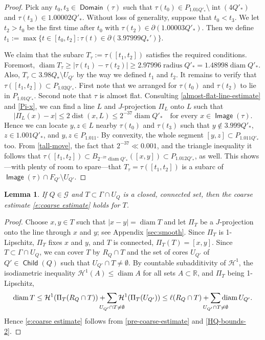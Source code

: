 \documentclass[12pt]{amsart}
\numberwithin{equation}{section}
\theoremstyle{plain}
\newtheorem{lemma}[theorem]{Lemma}
\theoremstyle{definition}
\def\RR{\mathbb{R}}
\newcommand{\radius}{\mathop\mathrm{radius}\nolimits}
\newcommand{\diam}{\mathop\mathrm{diam}\nolimits}
\newcommand{\dist}{\mathop\mathrm{dist}\nolimits}
\newcommand{\Haus}{\mathcal{H}}
\newcommand{\Domain}{\mathop\mathsf{Domain}\nolimits}
\newcommand{\Image}{\mathop\mathsf{Image}\nolimits}
\newcommand{\Child}{\mathop\mathsf{Child}\nolimits}
\newcommand{\interior}{\mathop\mathrm{int}\nolimits}
\numberwithin{figure}{section}
\begin{document}
\begin{proof}Pick any $t_0,t_3\in\Domain(\tau)$ such that $\tau(t_0)\in P_{1.01Q'_*}\setminus \interior(4Q'_*)$ and  $\tau(t_3)\in 1.00002Q'_*$. Without loss of generality, suppose that $t_0<t_3$. We let $t_2 > t_0$ be the first time after $t_0$ with $\tau(t_2) \in \partial(1.00003Q'_*)$. Then we define $t_1 := \max\{t \in [t_0, t_2] : \tau(t) \in \partial(3.97999Q_*') \}.$

We claim that the subarc $T_{\tau}:=\tau([t_1,t_2])$ satisfies the required conditions. Foremost, $\diam T_\tau\geq |\tau(t_1)-\tau(t_2)|\geq 2.97996 \radius Q'_*=1.48998\diam Q'_*$. Also, $T_{\tau}\subset 3.98Q_*\setminus U_{Q'}$ by the way we defined $t_1$ and $t_2$. It remains to verify that $\tau([t_1,t_2]) \subset P_{1.02Q'_*}$. First note that we arranged for $\tau(t_0)$ and $\tau(t_2)$ to lie in $P_{1.01 Q'_*}$. Second note that $\tau$ is almost flat. Consulting \eqref{almost-flat-line-estimate} and \eqref{Pi-x}, we can find a line $L$ and $J$-projection $\Pi_L$ onto $L$ such that \begin{equation}\label{tall-move} |\Pi_L(x)-x|\leq 2\dist(x,L)\leq 2^{-37}\diam Q'_*\quad\text{for every $x\in \Image(\tau)$}.\end{equation} Hence we can locate $y,z\in L$ nearby $\tau(t_0)$ and $\tau(t_3)$ such that $y\not\in 3.999Q'_*$, $z\in 1.001Q'_*$, and $y,z\in P_{1.011}$. By convexity, the whole segment $[y,z]\subset P_{1.011Q'_*}$ too. From \eqref{tall-move}, the fact that $2^{-37}\ll 0.001$, and the triangle inequality it follows that $\tau([t_1, t_2]) \subset B_{2^{-37}\diam Q'_*}([x, y]) \subset P_{1.012Q'_*}$, as well. This shows---with plenty of room to spare---that $T_\tau=\tau([t_1,t_2])$ is a subarc of $\Image(\tau)\cap F_{Q'}\setminus U_{Q'}$.
\end{proof}

\begin{lemma}\label{proof-of-coarse} If $Q\in\mathscr{G}$ and $T\subset \Gamma\cap U_Q$ is a closed, connected set, then the coarse estimate \eqref{e:coarse estimate} holds for $T$.\end{lemma}

\begin{proof} Choose $x,y\in T$ such that $|x-y|=\diam T$ and let $\Pi_T$ be a $J$-projection onto the line through $x$ and $y$; see Appendix \ref{sec:smooth}. Since $\Pi_T$ is 1-Lipschitz, $\Pi_T$ fixes $x$ and $y$, and $T$ is connected, $\Pi_T(T)=[x,y]$. Since $T\subset \Gamma\cap U_Q$, we can cover $T$ by $R_Q\cap T$ and the set of cores $U_{Q'}$ of $Q'\in\Child(Q)$ such that $U_{Q'}\cap T\neq\emptyset$. By countable subadditivity of $\Haus^1$, the isodiametric inequality $\Haus^1(A)\leq \diam A$ for all sets $A\subset\RR$, and $\Pi_T$ being 1-Lipschitz,  \begin{equation}\label{pre-coarse-estimate} \diam T \leq \Haus^1(\Pi_T(R_Q\cap T))+\sum_{\mathclap{U_{Q'}\cap T\neq\emptyset}}\Haus^1(\Pi_T(U_{Q'})) \leq \ell(R_Q\cap T)+\sum_{\mathclap{U_{Q'}\cap T\neq\emptyset}} \diam U_{Q'}.\end{equation} Hence \eqref{e:coarse estimate} follows from \eqref{pre-coarse-estimate} and \eqref{HQ-bounds-2}. \end{proof}
\end{document}

